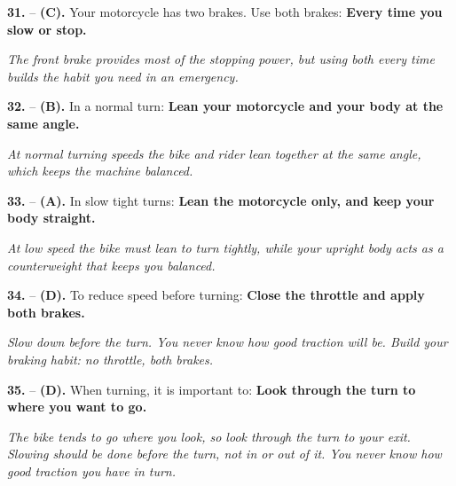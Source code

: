 \begin{minipage}{\linewidth}
\noindent\textbf{31.}  -- \textbf {(C).} Your motorcycle has two brakes. Use both brakes:  \textbf {Every time you slow or stop.} \par \textit {The front brake provides most of the stopping power, but using both every time builds the habit you need in an emergency.} \\
\end{minipage}

\begin{minipage}{\linewidth}
\noindent\textbf{32.}  -- \textbf {(B).} In a normal turn:  \textbf {Lean your motorcycle and your body at the same angle.} \par \textit {At normal turning speeds the bike and rider lean together at the same angle, which keeps the machine balanced.} \\
\end{minipage}

\begin{minipage}{\linewidth}
\noindent\textbf{33.}  -- \textbf {(A).} In slow tight turns:  \textbf {Lean the motorcycle only, and keep your body straight.} \par \textit {At low speed the bike must lean to turn tightly, while your upright body acts as a counterweight that keeps you balanced.} \\
\end{minipage}

\begin{minipage}{\linewidth}
\noindent\textbf{34.}  -- \textbf {(D).} To reduce speed before turning:  \textbf {Close the throttle and apply both brakes.} \par \textit {Slow down before the turn. You never know how good traction will be. Build your braking habit: no throttle, both brakes.} \\
\end{minipage}

\begin{minipage}{\linewidth}
\noindent\textbf{35.}  -- \textbf {(D).} When turning, it is important to:  \textbf {Look through the turn to where you want to go.} \par \textit {The bike tends to go where you look, so look through the turn to your exit. Slowing should be done before the turn, not in or out of it. You never know how good traction you have in turn.} \\
\end{minipage}

